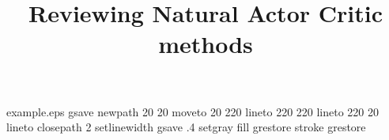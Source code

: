 %
%
%
%
%
\begin{filecontents*}{example.eps}
gsave
newpath
  20 20 moveto
  20 220 lineto
  220 220 lineto
  220 20 lineto
closepath
2 setlinewidth
gsave
  .4 setgray fill
grestore
stroke
grestore
\end{filecontents*}
%
\RequirePackage{fix-cm}
%
\documentclass[smallextended]{svjour3}       %
%
\smartqed  %
%
\usepackage{graphicx}

%
%

\usepackage{natbib} %
\usepackage{amsmath, amssymb}
\usepackage{algorithm}
\usepackage{algorithmic}


\newcommand{\x}{\item}
\newcommand{\parTitle}[1]{\textbf{#1:}}
\DeclareMathOperator{\E}{\mathbb{E}}
\setlength\parindent{0pt}

%
%

\title{Reviewing Natural Actor Critic methods
}

